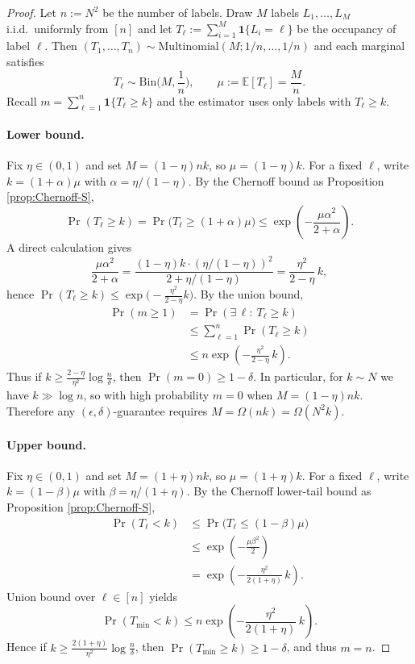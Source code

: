 \documentclass[aps,prx,reprint,superscriptaddress,amsmath,amssymb,longbibliography,floatfix]{revtex4-2}
\newcommand{\dsE}{\mathbb{E}}
\theoremstyle{plain}
\theoremstyle{definition}
\theoremstyle{remark}
\begin{document}
\begin{proof}
Let $n:=N^2$ be the number of labels. Draw $M$ labels $L_1,\dots,L_M$ i.i.d.\ uniformly from $[n]$ and
let $T_\ell:=\sum_{i=1}^M \mathbf 1\{L_i=\ell\}$ be the occupancy of label $\ell$.
Then $(T_1,\dots,T_n)\sim \mathrm{Multinomial}(M;1/n,\dots,1/n)$ and each marginal satisfies
\[
T_\ell \sim \mathrm{Bin}\Big(M,\frac{1}{n}\Big),\qquad \mu:=\dsE[T_\ell]=\frac{M}{n}.
\]
Recall $m=\sum_{\ell=1}^n \mathbf 1\{T_\ell\ge k\}$ and the estimator uses only labels with $T_\ell\ge k$.

\paragraph{Lower bound.}
Fix $\eta\in(0,1)$ and set $M=(1-\eta)nk$, so $\mu=(1-\eta)k$.
For a fixed $\ell$, write $k=(1+\alpha)\mu$ with $\alpha=\eta/(1-\eta)$. By the Chernoff bound as Proposition \ref{prop:Chernoff-S},
\[
\Pr(T_\ell\ge k)=\Pr\big(T_\ell\ge (1+\alpha)\mu\big)
\le \exp\!\left(-\frac{\mu\alpha^2}{2+\alpha}\right).
\]
A direct calculation gives
\[
\frac{\mu\alpha^2}{2+\alpha}
=
\frac{(1-\eta)k\cdot (\eta/(1-\eta))^2}{2+\eta/(1-\eta)}
=
\frac{\eta^2}{2-\eta}\,k,
\]
hence $\Pr(T_\ell\ge k)\le \exp\!\big(-\frac{\eta^2}{2-\eta}k\big)$.
By the union bound,
\begin{equation}
\begin{aligned}
\Pr(m\ge 1)&=\Pr(\exists\,\ell:\ T_\ell\ge k)\\
&\le \sum_{\ell=1}^n \Pr(T_\ell\ge k)\\
&\le n\exp\!\left(-\frac{\eta^2}{2-\eta}\,k\right).
\end{aligned}
\label{eq:app-local-collision-obstruction}
\end{equation}
Thus if $k\ge \frac{2-\eta}{\eta^2}\log\frac{n}{\delta}$, then $\Pr(m=0)\ge 1-\delta$.
In particular, for $k\sim N$ we have $k\gg \log n$, so with high probability $m=0$ when $M=(1-\eta)nk$.
Therefore any $(\epsilon,\delta)$-guarantee requires $M=\Omega(nk)=\Omega(N^2k)$.

\paragraph{Upper bound.}
Fix $\eta\in(0,1)$ and set $M=(1+\eta)nk$, so $\mu=(1+\eta)k$.
For a fixed $\ell$, write $k=(1-\beta)\mu$ with $\beta=\eta/(1+\eta)$. By the Chernoff lower-tail bound as Proposition \ref{prop:Chernoff-S},
\[
\begin{aligned}
\Pr(T_\ell<k)&\le \Pr\big(T_\ell\le (1-\beta)\mu\big)\\
&\le \exp\!\left(-\frac{\mu\beta^2}{2}\right)\\
&= \exp\!\left(-\frac{\eta^2}{2(1+\eta)}\,k\right).
\end{aligned}
\]
Union bound over $\ell\in[n]$ yields
\begin{equation}
\Pr(T_{\min}<k)\le n\exp\!\left(-\frac{\eta^2}{2(1+\eta)}\,k\right).
\label{eq:app-local-full-coverage-tail}
\end{equation}
Hence if $k\ge \frac{2(1+\eta)}{\eta^2}\log\frac{n}{\delta}$, then $\Pr(T_{\min}\ge k)\ge 1-\delta$, and thus $m=n$.


\end{proof}
\end{document}
